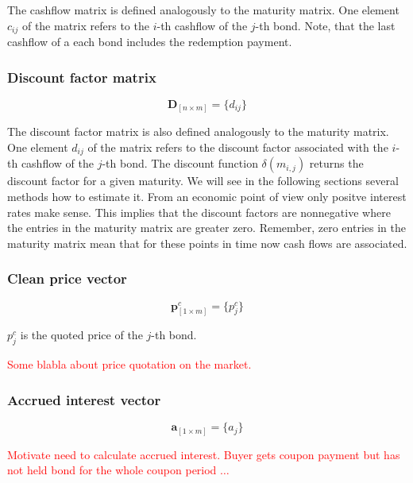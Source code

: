  The cashflow matrix is defined analogously to the maturity matrix.  One element $c_{ij}$  of the matrix refers to the $i$-th cashflow of the $j$-th bond. Note, that the last cashflow of a each bond includes the redemption payment.

\subsubsection*{Discount factor matrix}

 \begin{equation}\label{discountm}
\bm{D}_{\left[n\times m\right]}= \{d_{ij}\}
\end{equation}

The discount factor matrix is also defined analogously to the maturity matrix. One element $d_{ij}$ of the matrix refers to the discount factor associated with  the $i$-th cashflow of the $j$-th bond. The discount function $\delta(m_{i,j})$ returns the discount factor for a given maturity. We will see in the following sections several methods how to estimate it. From an economic point of view only positve interest rates make sense. This implies that the discount factors are nonnegative where the entries in the maturity matrix are greater zero. Remember, zero entries in the maturity matrix mean that for these points in time now cash flows are associated.

\subsubsection*{Clean price vector}

 \begin{equation}\label{pc}
\bm{p}^c_{\left[1\times m\right]}= \{p^c_j\}
\end{equation}

$p_{j}^c$ is the quoted price of the $j$-th bond.

\textcolor{red}{Some blabla about price quotation on the market.}

\subsubsection*{Accrued interest vector}

  \begin{equation}\label{a}
\bm{a}_{\left[1\times m\right]}= \{a_j\}
\end{equation}


\textcolor{red}{Motivate need to calculate accrued interest. Buyer gets coupon payment but has not held bond for the whole coupon period $\dots$}

